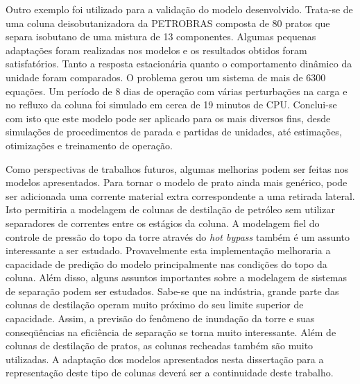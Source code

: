 Outro exemplo foi utilizado para a validação do modelo desenvolvido. Trata-se de uma coluna
deisobutanizadora da PETROBRAS composta de 80 pratos que separa isobutano de
uma mistura de 13 componentes. Algumas pequenas adaptações foram realizadas nos modelos e os resultados obtidos
foram satisfatórios. Tanto a resposta estacionária quanto o comportamento dinâmico da
unidade foram comparados. O problema gerou um sistema de mais de 6300 equações. Um período de
8 dias de operação com várias perturbações na carga e no refluxo da coluna foi simulado em
cerca de 19 minutos de CPU. Conclui-se com isto que este modelo pode ser aplicado para os
mais diversos fins, desde simulações de procedimentos de parada e partidas de unidades, até
estimações, otimizações e treinamento de operação.

Como perspectivas de trabalhos futuros, algumas melhorias podem ser feitas nos modelos apresentados.
Para tornar o modelo de prato ainda mais genérico, pode ser adicionada uma corrente material extra
correspondente a uma retirada lateral. Isto permitiria a modelagem de colunas de destilação de petróleo
sem utilizar separadores de correntes entre os estágios da coluna.
A modelagem fiel do controle de pressão do topo da torre através do \textit{hot bypass} também é um assunto
interessante a ser estudado. Provavelmente esta implementação melhoraria a capacidade de predição do modelo
principalmente nas condições do topo da coluna.
Além disso, alguns assuntos importantes sobre a modelagem
de sistemas de separação podem ser estudados.
Sabe-se que na indústria, grande parte das colunas de destilação operam muito próximo
do seu limite superior de capacidade. Assim, a previsão do fenômeno de inundação da torre
e suas conseqüências na eficiência de separação se torna muito interessante.
Além de colunas de destilação de pratos, as colunas recheadas também são muito utilizadas.
A adaptação dos modelos apresentados nesta dissertação para a
representação deste tipo de colunas deverá ser a continuidade deste trabalho.

